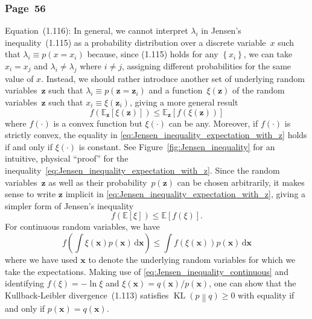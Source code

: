 \documentclass[12pt,a4paper]{article}
\newcommand{\erratum}[1]{\subsubsection*{#1}}
\begin{document}
\erratum{Page~56}
Equation~(1.116):
In general, we cannot interpret $\lambda_i$ in Jensen's inequality~(1.115) as
a probability distribution over a discrete variable~$x$ such that $\lambda_i \equiv p(x = x_i)$
because, since (1.115) holds for any $\left\{x_i\right\}$,
we can take $x_i = x_j$ and $\lambda_i \neq \lambda_j$ where $i \neq j$,
assigning different probabilities for the same value of $x$.
Instead, we should rather introduce another set of underlying random variables~$\mathbf{z}$
such that $\lambda_i \equiv p(\mathbf{z} = \mathbf{z}_i)$ and
a function~$\xi(\mathbf{z})$ of the random variables~$\mathbf{z}$
such that $x_i \equiv \xi(\mathbf{z}_i)$,
giving a more general result
\begin{equation}
f\left(\mathbb{E}_{\mathbf{z}}\left[\xi(\mathbf{z})\right]\right)
\leqslant \mathbb{E}_{\mathbf{z}}\left[f\left(\xi(\mathbf{z})\right)\right]
\label{eq:Jensen_inequality_expectation_with_z}
\end{equation}
where $f(\cdot)$ is a convex function but $\xi(\cdot)$ can be any.
Moreover, if $f(\cdot)$ is strictly convex,
the equality in \eqref{eq:Jensen_inequality_expectation_with_z} holds if and only if
$\xi(\cdot)$ is constant.
See Figure~\ref{fig:Jensen_inequality} for an intuitive, physical ``proof'' for
the inequality~\eqref{eq:Jensen_inequality_expectation_with_z}.
Since the random variables~$\mathbf{z}$ as well as their probability~$p(\mathbf{z})$ can be chosen
arbitrarily,
it makes sense to write $\mathbf{z}$ implicit in \eqref{eq:Jensen_inequality_expectation_with_z},
giving a simpler form of Jensen's inequality
\begin{equation}
f\left(\mathbb{E}\left[\xi\right]\right)
\leqslant \mathbb{E}\left[f\left(\xi\right)\right] .
\label{eq:Jensen_inequality_expectation}
\end{equation}
For continuous random variables, we have
\begin{equation}
f\left(\int\xi(\mathbf{x}) p(\mathbf{x}) \,\mathrm{d}\mathbf{x}\right) \leqslant 
\int f\left(\xi(\mathbf{x})\right) p(\mathbf{x}) \,\mathrm{d}\mathbf{x}
\label{eq:Jensen_inequality_continuous}
\end{equation}
where we have used $\mathbf{x}$ to denote the underlying random variables
for which we take the expectations.
Making use of \eqref{eq:Jensen_inequality_continuous} and
identifying $f(\xi) = -\ln\xi$ and $\xi(\mathbf{x}) = q(\mathbf{x})/p(\mathbf{x})$,
one can show that the Kullback-Leibler divergence~(1.113) satisfies
$\operatorname{KL}\left( p \middle\| q \right) \geqslant 0$ with equality if and only if
$p(\mathbf{x}) = q(\mathbf{x})$.
\end{document}
